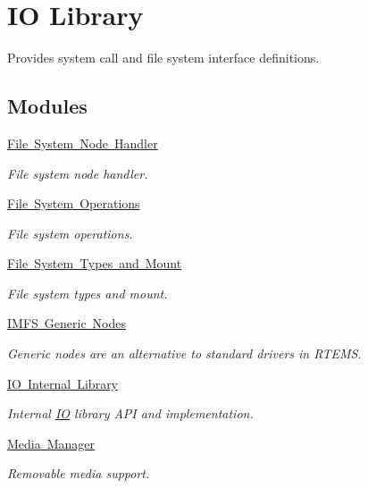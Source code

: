 \hypertarget{group__LibIO}{}\section{IO Library}
\label{group__LibIO}


Provides system call and file system interface definitions.  


\subsection*{Modules}
\begin{DoxyCompactItemize}
\item 
\mbox{\hyperlink{group__LibIOFSHandler}{File System Node Handler}}
\begin{DoxyCompactList}\small\item\em File system node handler. \end{DoxyCompactList}\item 
\mbox{\hyperlink{group__LibIOFSOps}{File System Operations}}
\begin{DoxyCompactList}\small\item\em File system operations. \end{DoxyCompactList}\item 
\mbox{\hyperlink{group__FileSystemTypesAndMount}{File System Types and Mount}}
\begin{DoxyCompactList}\small\item\em File system types and mount. \end{DoxyCompactList}\item 
\mbox{\hyperlink{group__IMFSGenericNodes}{I\+M\+F\+S Generic Nodes}}
\begin{DoxyCompactList}\small\item\em Generic nodes are an alternative to standard drivers in R\+T\+E\+MS. \end{DoxyCompactList}\item 
\mbox{\hyperlink{group__LibIOInternal}{I\+O Internal Library}}
\begin{DoxyCompactList}\small\item\em Internal \mbox{\hyperlink{structIO}{IO}} library A\+PI and implementation. \end{DoxyCompactList}\item 
\mbox{\hyperlink{group__RTEMSIOMedia}{Media Manager}}
\begin{DoxyCompactList}\small\item\em Removable media support. \end{DoxyCompactList}\item 

\end{DoxyCompactItemize}
